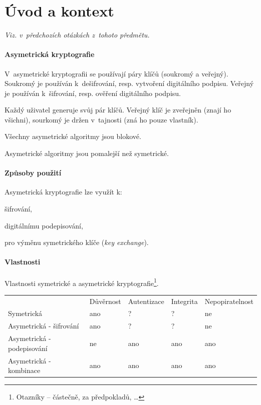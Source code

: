 \section{Úvod a kontext}

\textit{Viz.  v~předchozích otázkách z~tohoto předmětu.}

\paragraph*{Asymetrická kryptografie} \begin{compactitem}
    \item V~asymetrické kryptografii se používají páry klíčů (soukromý a veřejný). Soukromý je používán k~dešifrování, resp. vytvoření digitálního podpisu. Veřejný je používán k~šifrování, resp. ověření digitálního podpisu.
    \item Každý uživatel generuje svůj pár klíčů. Veřejný klíč je zveřejněn (znají ho všichni), sourkomý je držen v~tajnosti (zná ho pouze vlastník).
    \item Všechny asymetrické algoritmy jsou blokové.
    \item Asymetrické algoritmy jsou pomalejší než symetrické.
\end{compactitem}

\paragraph*{Způsoby použití} Asymetrická kryptografie lze využít k: \begin{compactitem}
    \item šifrování,
    \item digitálnímu podepisování,
    \item pro výměnu symetrického klíče (\textit{key exchange}).
\end{compactitem}

\paragraph*{Vlastnosti} Vlastnosti symetrické a asymetrické kryptografie\footnote{Otazníky -- částečně, za předpokladů, \dots}.
\begin{table}[H]
\begin{tabular}{lllll}
& Důvěrnost & Autentizace & Integrita & Nepopiratelnost \\
Symetrická & ano & ? & ? & ne \\
Asymetrická - šifrování & ano & ? & ? & ne \\
Asymetrická - podepisování & ne & ano & ano & ano \\
Asymetrická - kombinace & ano & ano & ano & ano
\end{tabular}
\end{table}

